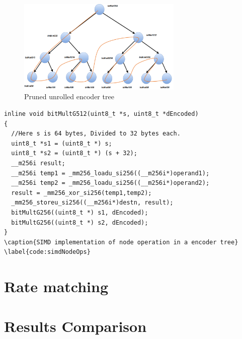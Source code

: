 \begin{figure}[]
	\centering
	\includegraphics[width=0.7\textwidth]{./figures/unrolledEncoder.pdf}
	\caption{Pruned unrolled encoder tree}
	\label{fig:unrolledEncoder}
\end{figure}

\begin{lstlisting}
inline void bitMultG512(uint8_t *s, uint8_t *dEncoded) 
{
  //Here s is 64 bytes, Divided to 32 bytes each.
  uint8_t *s1 = (uint8_t *) s;
  uint8_t *s2 = (uint8_t *) (s + 32);
  __m256i result;
  __m256i temp1 = _mm256_loadu_si256((__m256i*)operand1);
  __m256i temp2 = _mm256_loadu_si256((__m256i*)operand2);
  result = _mm256_xor_si256(temp1,temp2);
  _mm256_storeu_si256((__m256i*)destn, result);
  bitMultG256((uint8_t *) s1, dEncoded);
  bitMultG256((uint8_t *) s2, dEncoded);
}
\caption{SIMD implementation of node operation in a encoder tree}
\label{code:simdNodeOps}
\end{lstlisting}

\section{Rate matching}

\section{Results Comparison}



